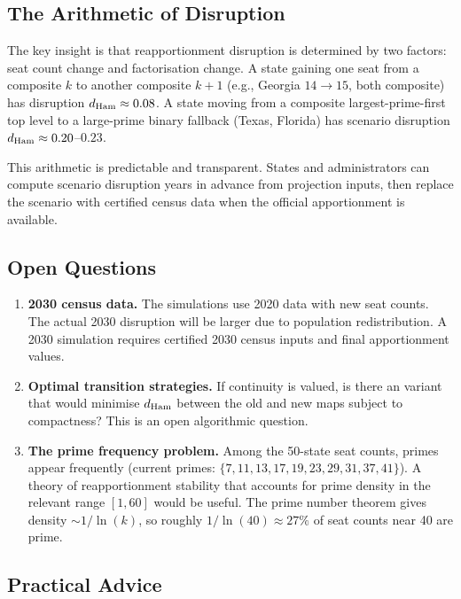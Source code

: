 \subsection{The Arithmetic of Disruption}

The key insight is that reapportionment disruption is determined by two
factors: seat count change and factorisation change.
A state gaining one seat from a composite $k$ to another composite $k+1$
(e.g., Georgia $14 \to 15$, both composite) has disruption $d_{\rm Ham} \approx 0.08$.
A state moving from a composite largest-prime-first top level to a large-prime
binary fallback (Texas, Florida) has scenario disruption
$d_{\rm Ham} \approx 0.20$--$0.23$.

This arithmetic is predictable and transparent.
States and administrators can compute scenario disruption years in advance
from projection inputs, then replace the scenario with certified census data
when the official apportionment is available.

\subsection{Open Questions}

\begin{enumerate}
\item \textbf{2030 census data.}
      The simulations use 2020 data with new seat counts.
      The actual 2030 disruption will be larger due to population redistribution.
      A 2030 simulation requires certified 2030 census inputs and final
      apportionment values.

\item \textbf{Optimal transition strategies.}
      If continuity is valued, is there an \ar{} variant that
      would minimise $d_{\rm Ham}$ between the old and new maps
      subject to compactness?
      This is an open algorithmic question.

\item \textbf{The prime frequency problem.}
      Among the 50-state seat counts, primes appear frequently
      (current primes: $\{7, 11, 13, 17, 19, 23, 29, 31, 37, 41\}$).
      A theory of reapportionment stability that accounts for prime
      density in the relevant range $[1, 60]$ would be useful.
      The prime number theorem gives density $\sim 1/\ln(k)$, so
      roughly $1/\ln(40) \approx 27\%$ of seat counts near 40 are prime.
\end{enumerate}

\subsection{Practical Advice}

